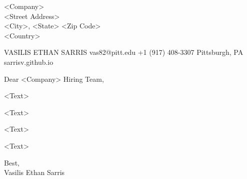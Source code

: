 \documentclass{letter}
\begin{document}
{
    \address{<Address> \\ Pittsburgh, PA 15213\\ United States}
    \begin{letter}{
        <Company> \\ 
        <Street Address> \\ 
        <City>, <State> <Zip Code> \\ 
        <Country>
    }
    
    \header
        {VASILIS ETHAN SARRIS}
        {vas82@pitt.edu} 
        {+1 (917) 408-3307} 
        {Pittsburgh, PA}
        {sarrisv.github.io}
        
    \opening{Dear <Company> Hiring Team,}
        \quad \quad <Text>         
            
        \quad \quad <Text>
        
	    \quad \quad <Text>
	    
	    \quad \quad <Text>
    
    \closing{Best, \\ Vasilis Ethan Sarris}
    \end{letter}
}
\end{document}
